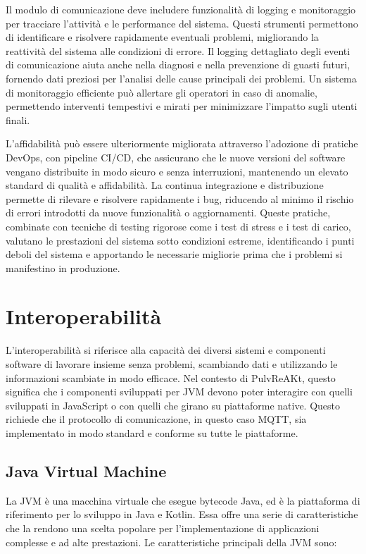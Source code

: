\documentclass[12pt,a4paper,openright,twoside]{book}
\begin{document}
Il modulo di comunicazione deve includere funzionalità di logging e monitoraggio per tracciare l'attività e le performance del sistema. Questi strumenti permettono 
di identificare e risolvere rapidamente eventuali problemi, migliorando la reattività del sistema alle condizioni di errore. Il logging dettagliato degli eventi di 
comunicazione aiuta anche nella diagnosi e nella prevenzione di guasti futuri, fornendo dati preziosi per l'analisi delle cause principali dei problemi. 
Un sistema di monitoraggio efficiente può allertare gli operatori in caso di anomalie, permettendo interventi tempestivi e mirati per minimizzare l'impatto sugli utenti finali.

L'affidabilità può essere ulteriormente migliorata attraverso l'adozione di pratiche DevOps, con pipeline \ac{CI/CD}, che assicurano che le nuove versioni del software 
vengano distribuite in modo sicuro e senza interruzioni, mantenendo un elevato standard di qualità e affidabilità. La continua integrazione e distribuzione permette di 
rilevare e risolvere rapidamente i bug, riducendo al minimo il rischio di errori introdotti da nuove funzionalità o aggiornamenti. Queste pratiche, combinate con tecniche 
di testing rigorose come i test di stress e i test di carico, valutano le prestazioni del sistema sotto condizioni estreme, identificando i punti deboli del sistema e 
apportando le necessarie migliorie prima che i problemi si manifestino in produzione.

\section{Interoperabilità}

L'interoperabilità si riferisce alla capacità dei diversi sistemi e componenti software di lavorare insieme senza problemi, scambiando dati e utilizzando le informazioni scambiate 
in modo efficace. Nel contesto di PulvReAKt, questo significa che i componenti sviluppati per \ac{JVM} devono poter interagire con quelli sviluppati in JavaScript o con quelli 
che girano su piattaforme native. Questo richiede che il protocollo di comunicazione, in questo caso \ac{MQTT}, sia implementato in modo standard e conforme su tutte le piattaforme.
\subsection{Java Virtual Machine}

La \ac{JVM} è una macchina virtuale che esegue bytecode Java, ed è la piattaforma di riferimento per lo sviluppo in Java e Kotlin. 
Essa offre una serie di caratteristiche che la rendono una scelta popolare per l'implementazione di applicazioni complesse e ad alte prestazioni.
Le caratteristiche principali della \ac{JVM} sono:
\end{document}
